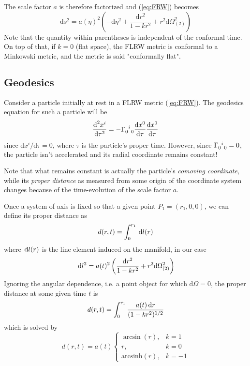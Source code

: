 \par The scale factor $a$ is therefore factorized and (\ref{eq:FRW}) becomes
\begin{equation}
    \text{d}s^{2} = a(\eta)^{2}\left(-\text{d}\eta^{2}+\frac{\text{d}r^{2}}{1-kr^{2}}+r^{2}\text{d}\Omega_{(2)}^{2}\right)
    \label{eq:FRW_conf}
\end{equation}
Note that the quantity within parentheses is independent of the conformal time. On top of that, if $k=0$ (flat space), the FLRW metric is conformal to a Minkowski metric, and the metric is said "conformally flat".

\subsection{Geodesics}

Consider a particle initially at rest in a FLRW metric (\ref{eq:FRW}). The geodesics equation for such a particle will be
\begin{equation}
    \frac{\text{d}^{2}x^{i}}{\text{d}\tau^{2}} = -\Gamma_{0\;\;0}^{\;\;i}\frac{\text{d}x^{0}}{\text{d}\tau}\frac{\text{d}x^{0}}{\text{d}\tau}
\end{equation}
since $\text{d}x^{i}/\text{d}\tau = 0$, where $\tau$ is the particle's proper time. However, since $\Gamma_{0\;\;0}^{\;\;i} = 0$, the particle isn't accelerated and its radial coordinate remains constant!
\par Note that what remains constant is actually the particle's \emph{comoving coordinate}, while its \emph{proper distance} as measured from some origin of the coordinate system changes because of the time-evolution of the scale factor $a$.
\par Once a system of axis is fixed so that a given point $P_{1} = (r_{1},0,0)$, we can define its proper distance as
\begin{equation}
    d(r,t) = \int_{0}^{r_{1}} \,\text{d}l(r)
\end{equation}
where $\,\text{d}l(r)$ is the line element induced on the manifold, in our case
\begin{equation}
    \,\text{d}l^{2} = a(t)^{2}\left(\frac{\text{d}r^{2}}{1-kr^{2}}+r^{2}\text{d}\Omega_{(2)}^{2}\right)
\end{equation}
Ignoring the angular dependence, i.e. a point object for which $\text{d}\Omega = 0$, the proper distance at some given time $t$ is
\begin{equation}
    d(r,t) = \int_{0}^{r_{1}} \frac{a(t)\,\text{d}r}{(1-kr^{2})^{1/2}}
\end{equation}
which is solved by
\begin{equation}
    d(r,t) = a(t)\left\{
    \begin{array}{ll}
        \arcsin(r), & k=1\\
        r, & k=0\\
        \text{arcsinh}(r), & k=-1
    \end{array}
    \right.
\end{equation}
